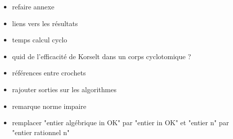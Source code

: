 \begin{itemize}
	\item refaire annexe
	\item liens vers les résultats
	\item temps calcul cyclo
	\item quid de l'efficacité de Korselt dans un corps cyclotomique ?
	\item références entre crochets
	\item rajouter sorties sur les algorithmes
	\item remarque norme impaire
	\item remplacer "entier algébrique in OK" par "entier in OK" et "entier n" par "entier rationnel n"
\end{itemize}
